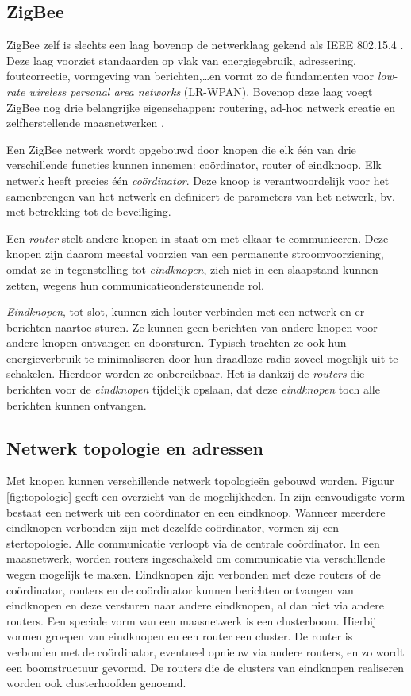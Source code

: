 \subsection{ZigBee}
\label{subsection:zigbee}

ZigBee zelf is slechts een laag bovenop de netwerklaag gekend als IEEE 802.15.4
\cite{ieee2009802.15.4}. Deze laag voorziet standaarden op vlak van
energiegebruik, adressering, foutcorrectie, vormgeving van berichten,\dots en
vormt zo de fundamenten voor \emph{low-rate wireless personal area networks}
(LR-WPAN). Bovenop deze laag voegt ZigBee nog drie belangrijke eigenschappen:
routering, ad-hoc netwerk creatie en zelfherstellende maasnetwerken
\cite{oreilly2010buildingwsn}.

Een ZigBee netwerk wordt opgebouwd door knopen die elk \'e\'en van drie
verschillende functies kunnen innemen: co\"ordinator, router of eindknoop. Elk
netwerk heeft precies \'e\'en \emph{co\"ordinator}. Deze knoop is
verantwoordelijk voor het samenbrengen van het netwerk en definieert de
parameters van het netwerk, bv. met betrekking tot de beveiliging.

Een \emph{router} stelt andere knopen in staat om met elkaar te communiceren.
Deze knopen zijn daarom meestal voorzien van een permanente stroomvoorziening,
omdat ze in tegenstelling tot \emph{eindknopen}, zich niet in een slaapstand
kunnen zetten, wegens hun communicatieondersteunende rol.

\emph{Eindknopen}, tot slot, kunnen zich louter verbinden met een netwerk en er
berichten naartoe sturen. Ze kunnen geen berichten van andere knopen voor
andere knopen ontvangen en doorsturen. Typisch trachten ze ook hun
energieverbruik te minimaliseren door hun draadloze radio zoveel mogelijk uit
te schakelen. Hierdoor worden ze onbereikbaar. Het is dankzij de \emph{routers}
die berichten voor de \emph{eindknopen} tijdelijk opslaan, dat deze
\emph{eindknopen} toch alle berichten kunnen ontvangen.

\subsection{Netwerk topologie en adressen}
\label{subsection:topologie}

Met knopen kunnen verschillende netwerk topologie\"en gebouwd worden. Figuur
\ref{fig:topologie} geeft een overzicht van de mogelijkheden. In zijn
eenvoudigste vorm bestaat een netwerk uit een co\"ordinator en een eindknoop.
Wanneer meerdere eindknopen verbonden zijn met dezelfde co\"ordinator, vormen
zij een stertopologie. Alle communicatie verloopt via de centrale
co\"ordinator. In een maasnetwerk, worden routers ingeschakeld om communicatie
via verschillende wegen mogelijk te maken. Eindknopen zijn verbonden met deze
routers of de co\"ordinator, routers en de co\"ordinator kunnen berichten
ontvangen van eindknopen en deze versturen naar andere eindknopen, al dan niet
via andere routers. Een speciale vorm van een maasnetwerk is een clusterboom.
Hierbij vormen groepen van eindknopen en een router een cluster. De router is
verbonden met de co\"ordinator, eventueel opnieuw via andere routers, en zo
wordt een boomstructuur gevormd. De routers die de clusters van eindknopen
realiseren worden ook clusterhoofden genoemd.

